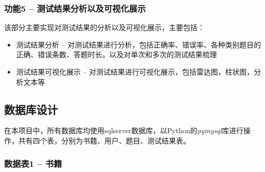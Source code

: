 \documentclass[twoside,11pt]{article}
\begin{document}
\vspace{0.5cm}

\subsubsection{功能5 -- 测试结果分析以及可视化展示}
该部分主要实现对测试结果的分析以及可视化展示，主要包括：
\begin{itemize}
    \item 测试结果分析 -- 对测试结果进行分析，包括正确率、错误率、各种类别题目的正确、错误条数、答题时长。以及对单次和多次的测试结果梳理
    \item 测试结果可视化展示 -- 对测试结果进行可视化展示，包括雷达图，柱状图，分析文本等
\end{itemize}
\subsection{数据库设计}

在本项目中，所有数据库均使用sqlserver数据库，以Python的\emph{pymysql}库进行操作，共有四个表，分别为书籍、用户、题目、测试结果表。
\subsubsection{数据表1 -- 书籍}
\end{document}
